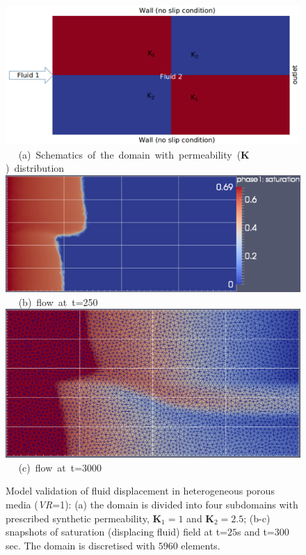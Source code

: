 \begin{figure}[ht] 
\vbox{
\hbox{\hspace{-0.3cm}
\includegraphics[width=.8\textwidth]{./Pics1/2b2_wi_fine/2b2_whole_in_fine_perm_1.pdf} 
}
\vspace{0.0cm}
\hbox{\hspace{3.5cm} (a) Schematics of the domain with permeability ($\mathbf{K}$) distribution
}
\vspace{0.25cm}
\hbox{\hspace{1.5cm}
\includegraphics[width=.85\textwidth]{./Pics1/2b2_wi_fine/2b2_whole_in_fine_250_2.pdf}
}
\vspace{0.0cm}
\hbox{\hspace{4.5cm} (b) flow at t=250 
}
\vspace{0.25cm}
\hbox{\hspace{1.5cm}
\includegraphics[width=.65\textwidth]{./Pics1/2b2_wi_fine/2b2_whole_in_fine_3000_2.pdf}
}
\vspace{0.0cm}
\hbox{\hspace{4.0cm} (c) flow at t=3000   
}}     
\caption{Model validation of fluid displacement in heterogeneous porous media ({\it VR}=1): (a) the domain is divided into four subdomains with prescribed synthetic permeability, $\mathbf{K}_{1}=1$ and $\mathbf{K}_{2}=2.5$; (b-c) snapshots of saturation (displacing fluid) field at t=$25$s and t=$300$ sec. The domain is discretised with $5960$  elements.  }
\label{fem_cv_represent_a}
\end{figure}
\clearpage



